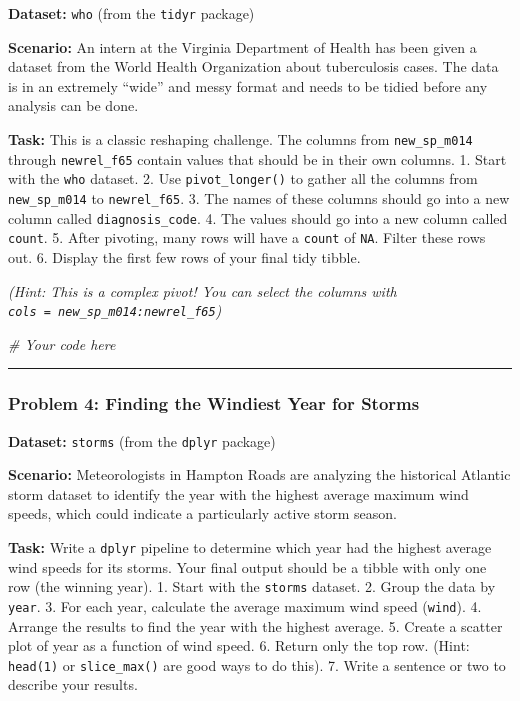\documentclass[
  11pt,
]{article}
\newenvironment{Shaded}{\begin{snugshade}}{\end{snugshade}}
\newcommand{\CommentTok}[1]{\textcolor[rgb]{0.56,0.35,0.01}{\textit{#1}}}
\begin{document}
\textbf{Dataset:} \texttt{who} (from the \texttt{tidyr} package)

\textbf{Scenario:} An intern at the Virginia Department of Health has
been given a dataset from the World Health Organization about
tuberculosis cases. The data is in an extremely ``wide'' and messy
format and needs to be tidied before any analysis can be done.

\textbf{Task:} This is a classic reshaping challenge. The columns from
\texttt{new\_sp\_m014} through \texttt{newrel\_f65} contain values that
should be in their own columns. 1. Start with the \texttt{who} dataset.
2. Use \texttt{pivot\_longer()} to gather all the columns from
\texttt{new\_sp\_m014} to \texttt{newrel\_f65}. 3. The names of these
columns should go into a new column called \texttt{diagnosis\_code}. 4.
The values should go into a new column called \texttt{count}. 5. After
pivoting, many rows will have a \texttt{count} of \texttt{NA}. Filter
these rows out. 6. Display the first few rows of your final tidy tibble.

\emph{(Hint: This is a complex pivot! You can select the columns with
\texttt{cols\ =\ new\_sp\_m014:newrel\_f65})}

\begin{Shaded}
\begin{Highlighting}[]
\CommentTok{\# Your code here}
\end{Highlighting}
\end{Shaded}

\begin{center}\rule{0.5\linewidth}{0.5pt}\end{center}

\subsubsection{Problem 4: Finding the Windiest Year for
Storms}\label{problem-4-finding-the-windiest-year-for-storms}

\textbf{Dataset:} \texttt{storms} (from the \texttt{dplyr} package)

\textbf{Scenario:} Meteorologists in Hampton Roads are analyzing the
historical Atlantic storm dataset to identify the year with the highest
average maximum wind speeds, which could indicate a particularly active
storm season.

\textbf{Task:} Write a \texttt{dplyr} pipeline to determine which year
had the highest average wind speeds for its storms. Your final output
should be a tibble with only one row (the winning year). 1. Start with
the \texttt{storms} dataset. 2. Group the data by \texttt{year}. 3. For
each year, calculate the average maximum wind speed (\texttt{wind}). 4.
Arrange the results to find the year with the highest average. 5. Create
a scatter plot of year as a function of wind speed. 6. Return only the
top row. (Hint: \texttt{head(1)} or \texttt{slice\_max()} are good ways
to do this). 7. Write a sentence or two to describe your results.
\end{document}
